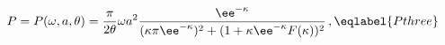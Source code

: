 \begin{equation}
P=P(\omega,a,\theta)=\frac\pi{2\theta} \omega a^2 \frac{\ee^{-\kappa}}
{(\kappa\pi\ee^{-\kappa})^2+(1+\kappa\ee^{-\kappa}F(\kappa))^2} \,,
\eqlabel{Pthree}
\end{equation}

